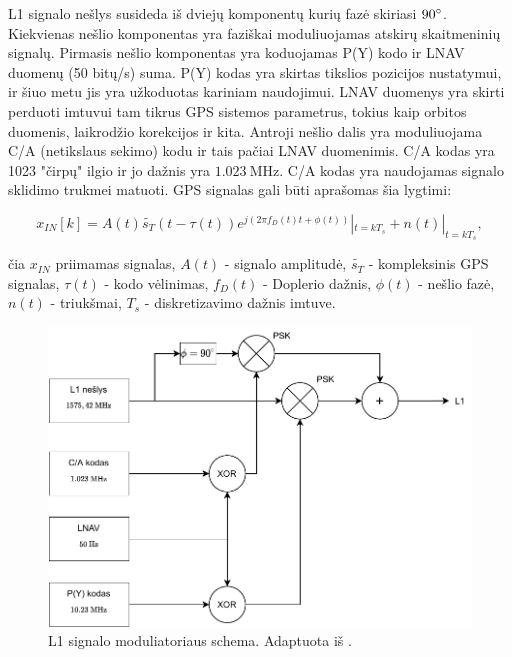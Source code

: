 \documentclass[main.tex]{subfiles}
\begin{document}
L1 signalo nešlys susideda iš dviejų komponentų kurių fazė skiriasi $90\degree$.
Kiekvienas nešlio komponentas yra faziškai moduliuojamas atskirų skaitmeninių signalų.
Pirmasis nešlio komponentas yra koduojamas P(Y) kodo ir LNAV duomenų (50 bitų/s) suma.
P(Y) kodas yra skirtas tikslios pozicijos nustatymui, ir šiuo metu jis yra užkoduotas
kariniam naudojimui.
LNAV duomenys yra skirti perduoti imtuvui tam tikrus GPS sistemos parametrus, tokius
kaip orbitos duomenis, laikrodžio korekcijos ir kita.
Antroji nešlio dalis yra moduliuojama C/A (netikslaus sekimo) kodu ir tais pačiai LNAV
duomenimis. C/A kodas yra 1023 "čirpų" ilgio ir jo dažnis yra $1.023\ \mathrm{MHz}$.
C/A kodas yra naudojamas signalo sklidimo trukmei matuoti. GPS signalas gali būti
aprašomas šia lygtimi:

\begin{equation}
    x_{IN}[k] = A(t) \widetilde{s_T}(t-\tau(t))e^{j(2\pi f_D(t)t+\phi(t))} |_{t=kT_s} + n(t) |_{t=kT_s},
    \label{eq:gps_signal}
\end{equation}

\noindent čia $x_{IN}$ priimamas signalas, $A(t)$ - signalo amplitudė, $\widetilde{s_T}$
- kompleksinis GPS signalas, $\tau(t)$ - kodo vėlinimas, $f_D(t)$ - Doplerio dažnis,
$\phi(t)$ - nešlio fazė, $n(t)$ - triukšmai, $T_s$ - diskretizavimo dažnis imtuve.

\begin{figure}[h]
    \begin{centering}
    \includegraphics[scale=0.85]{drawings/l1_signal}
    \par\end{centering}
    \protect\caption{\label{fig:l1_signal}L1 signalo moduliatoriaus schema. Adaptuota iš \cite{Sadeghi2008TimeSS}.}
\end{figure}
\end{document}
